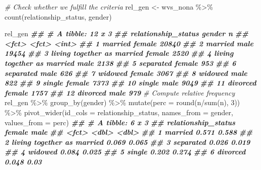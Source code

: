 \documentclass[
]{book}
\newenvironment{Shaded}{\begin{snugshade}}{\end{snugshade}}
\newcommand{\AttributeTok}[1]{\textcolor[rgb]{0.77,0.63,0.00}{#1}}
\newcommand{\CommentTok}[1]{\textcolor[rgb]{0.56,0.35,0.01}{\textit{#1}}}
\newcommand{\DecValTok}[1]{\textcolor[rgb]{0.00,0.00,0.81}{#1}}
\newcommand{\DocumentationTok}[1]{\textcolor[rgb]{0.56,0.35,0.01}{\textbf{\textit{#1}}}}
\newcommand{\FunctionTok}[1]{\textcolor[rgb]{0.00,0.00,0.00}{#1}}
\newcommand{\NormalTok}[1]{#1}
\newcommand{\OtherTok}[1]{\textcolor[rgb]{0.56,0.35,0.01}{#1}}
\newcommand{\SpecialCharTok}[1]{\textcolor[rgb]{0.00,0.00,0.00}{#1}}
\begin{document}
\begin{Shaded}
\begin{Highlighting}[]
\CommentTok{\# Check whether we fulfill the criteria}
\NormalTok{rel\_gen }\OtherTok{\textless{}{-}}\NormalTok{ wvs\_nona }\SpecialCharTok{\%\textgreater{}\%}
  \FunctionTok{count}\NormalTok{(relationship\_status, gender)}

\NormalTok{rel\_gen}
\DocumentationTok{\#\# \# A tibble: 12 x 3}
\DocumentationTok{\#\#    relationship\_status        gender     n}
\DocumentationTok{\#\#    \textless{}fct\textgreater{}                      \textless{}fct\textgreater{}  \textless{}int\textgreater{}}
\DocumentationTok{\#\#  1 married                    female 20840}
\DocumentationTok{\#\#  2 married                    male   19454}
\DocumentationTok{\#\#  3 living together as married female  2520}
\DocumentationTok{\#\#  4 living together as married male    2138}
\DocumentationTok{\#\#  5 separated                  female   953}
\DocumentationTok{\#\#  6 separated                  male     626}
\DocumentationTok{\#\#  7 widowed                    female  3067}
\DocumentationTok{\#\#  8 widowed                    male     822}
\DocumentationTok{\#\#  9 single                     female  7373}
\DocumentationTok{\#\# 10 single                     male    9049}
\DocumentationTok{\#\# 11 divorced                   female  1757}
\DocumentationTok{\#\# 12 divorced                   male     979}
\CommentTok{\# Compute relative frequency}
\NormalTok{rel\_gen }\SpecialCharTok{\%\textgreater{}\%} \FunctionTok{group\_by}\NormalTok{(gender) }\SpecialCharTok{\%\textgreater{}\%}
  \FunctionTok{mutate}\NormalTok{(}\AttributeTok{perc =} \FunctionTok{round}\NormalTok{(n}\SpecialCharTok{/}\FunctionTok{sum}\NormalTok{(n), }\DecValTok{3}\NormalTok{)) }\SpecialCharTok{\%\textgreater{}\%}
  \FunctionTok{pivot\_wider}\NormalTok{(}\AttributeTok{id\_cols =}\NormalTok{ relationship\_status,}
              \AttributeTok{names\_from =}\NormalTok{ gender,}
              \AttributeTok{values\_from =}\NormalTok{ perc)}
\DocumentationTok{\#\# \# A tibble: 6 x 3}
\DocumentationTok{\#\#   relationship\_status        female  male}
\DocumentationTok{\#\#   \textless{}fct\textgreater{}                       \textless{}dbl\textgreater{} \textless{}dbl\textgreater{}}
\DocumentationTok{\#\# 1 married                     0.571 0.588}
\DocumentationTok{\#\# 2 living together as married  0.069 0.065}
\DocumentationTok{\#\# 3 separated                   0.026 0.019}
\DocumentationTok{\#\# 4 widowed                     0.084 0.025}
\DocumentationTok{\#\# 5 single                      0.202 0.274}
\DocumentationTok{\#\# 6 divorced                    0.048 0.03}
\end{Highlighting}
\end{Shaded}
\end{document}
